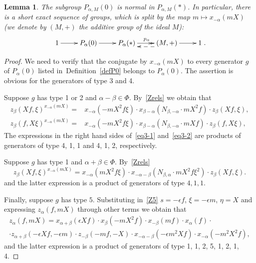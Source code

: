 \documentclass[oneside, 8pt]{amsart}
\newtheorem{lemma}{Lemma}
\theoremstyle{remark}
\theoremstyle{definition}
\numberwithin{lemma}{section}
\numberwithin{prop}{section}
\numberwithin{corollary}{section}
\numberwithin{externaltheorem}{section}
\numberwithin{equation}{section}
\begin{document}
\begin{lemma}\label{P0_normal} The subgroup $P_{\alpha, M}(0)$ is normal in $P_{\alpha, M}(*)$. In particular, there is a short exact sequence of groups, which is split by the map $m \mapsto x_{-\alpha}(mX)$ (we denote by $(M, +)$ the additive group of the ideal $M$):
\[\xymatrix{1 \ar[r] & P_\alpha(0) \ar[r] & P_\alpha(*) \ar@{->>}[r]^{p_\alpha} & (M, +) \ar@<5pt>@{-->}[l] \ar[r] & 1}.\] \end{lemma}
\begin{proof} We need to verify that the conjugate by $x_{-\alpha}(mX)$ to every generator $g$ of $P_\alpha(0)$ listed in~Definition~\ref{defP0} belongs to $P_\alpha(0)$.
The assertion is obvious for the generators of type 3 and 4.

Suppose $g$ has type 1 or 2 and $\alpha - \beta \in \Phi$. By~\cref{Zrels} we obtain that
\begin{align} z_{\beta}(Xf, \xi) ^ {x_{-\alpha}(mX)} = & x_{-\alpha} (- mX^2f\xi) \cdot x_{\beta-\alpha} (N_{\beta, -\alpha}\cdot mX^2f) \cdot z_{\beta}(Xf, \xi), \label{eq3-1} \\
  z_{\beta}(f, X\xi) ^ {x_{-\alpha}(mX)} = & x_{-\alpha} (- mX^2f\xi ) \cdot x_{\beta-\alpha} (N_{\beta, -\alpha}\cdot mXf) \cdot z_{\beta}(f, X\xi), \label{eq3-2} \end{align}
The expressions in the right hand sides of~\eqref{eq3-1} and~\eqref{eq3-2} are products of generators of type 4, 1, 1 and 4, 1, 2, respectively.  

Suppose $g$ has type 1 and  $\alpha + \beta \in \Phi$. By~\cref{Zrels} 
\begin{equation} \label{eq3-3} z_{\beta}(Xf, \xi) ^ {x_{-\alpha}(mX)} = x_{-\alpha} (mX^2f\xi ) \cdot x_{-\alpha-\beta} (N_{\beta,\alpha}\cdot mX^2f\xi^2) \cdot z_{\beta}(Xf, \xi). \end{equation}
and the latter expression is a product of generators of type $4, 1, 1$.

Finally, suppose $g$ has type $5$.
Substituting in~\eqref{Z5} $s = -\epsilon f$, $\xi = -\epsilon m$, $\eta=X$ and expressing $z_\alpha(f, mX)$ through other terms we obtain that
\begin{multline} \label{eq:zalpha} z_\alpha(f, mX) = x_{\alpha+\beta}(\epsilon Xf) \cdot x_{\beta}(-mX^2 f) \cdot x_{-\beta}(mf) \cdot x_\alpha(f) \cdot \\ 
 \cdot z_{\alpha+\beta}(-\epsilon X f, -\epsilon m) \cdot z_{-\beta}(-mf, -X) \cdot x_{-\alpha-\beta}(-\epsilon m^2X f) \cdot x_{-\alpha}(-m^2X^2 f), \end{multline}
and the latter expression is a product of generators of type 1, 1, 2, 5, 1, 2, 1, 4. \end{proof}
\end{document}
